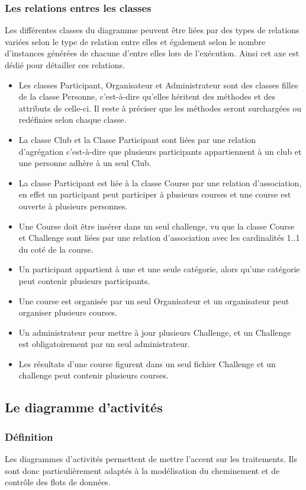 \subsubsection{Les relations entres les classes}
Les différentes classes du diagramme peuvent être liées par des types de relations variées selon le type de relation entre elles et également selon le nombre d’instances générées de chacune d’entre elles lors de l’exécution. Ainsi cet axe est dédié pour détailler ces relations.
\begin{itemize} 
 	\item Les classes Participant, Organisateur et Administrateur sont des classes filles de la classe Personne, c’est-à-dire qu’elles héritent des méthodes et des attributs de celle-ci. Il reste à préciser que les méthodes seront surchargées ou redéfinies selon chaque classe.
 	\item La classe Club et la Classe Participant sont liées par une relation d’agrégation c’est-à-dire que plusieurs participants appartiennent à un club et une personne adhère à un seul Club.
 	\item La classe Participant est liée à la classe Course par une relation d’association, en effet un participant peut participer à plusieurs courses et une course est ouverte à plusieurs personnes.
 	\item Une Course doit être insérer dans un seul challenge, vu que la classe Course et Challenge sont liées par une relation d’association avec les cardinalités 1..1 du coté de la course.
 	\item Un participant appartient à une et une seule catégorie, alors qu’une catégorie peut contenir plusieurs participants. 
	\item Une course est organisée par un seul Organisateur et un organisateur peut organiser plusieurs courses.
 	\item Un administrateur peur mettre à jour plusieurs Challenge, et un Challenge est obligatoirement par un seul administrateur.
 	\item Les résultats d’une course figurent dans un seul fichier Challenge et un challenge peut contenir plusieurs courses. 
\end{itemize} 


\subsection {Le diagramme d’activités}
\subsubsection{Définition}
Les diagrammes d'activités permettent de mettre l'accent sur les traitements. Ils sont donc particulièrement adaptés à la modélisation du cheminement et de contrôle des flots de données. 
